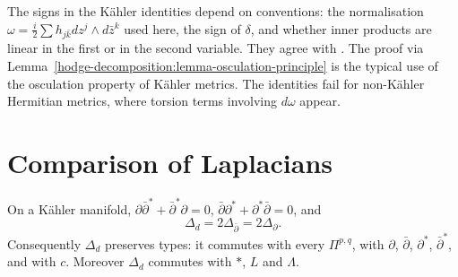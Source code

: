 \begin{remark}\label{hodge-decomposition:remark-identities-conventions}
The signs in the K\"ahler identities depend on conventions: the normalisation $\omega = \frac{i}{2}\sum h_{j\bar k}dz^j \wedge d\bar z^k$
used here, the sign of $\delta$, and whether inner products are linear in the first or in the second variable. They agree with
\cite[Proposition 3.1.12]{huybrechts-complex}. The proof via Lemma~\ref{hodge-decomposition:lemma-osculation-principle} is the typical use
of the osculation property of K\"ahler metrics. The identities fail for non-K\"ahler Hermitian metrics, where torsion terms involving
$d\omega$ appear.
\end{remark}

\section{Comparison of Laplacians}\label{hodge-decomposition:section-laplacians}

\begin{theorem}\label{hodge-decomposition:theorem-laplacians}
On a K\"ahler manifold, $\partial\bar\partial^* + \bar\partial^*\partial = 0$, $\bar\partial\partial^* + \partial^*\bar\partial = 0$, and
\[
\Delta_d = 2\Delta_{\bar\partial} = 2\Delta_\partial .
\]
Consequently $\Delta_d$ preserves types: it commutes with every $\Pi^{p,q}$, with $\partial$, $\bar\partial$, $\partial^*$,
$\bar\partial^*$, and with $c$. Moreover $\Delta_d$ commutes with $*$, $L$ and $\Lambda$.
\end{theorem}

